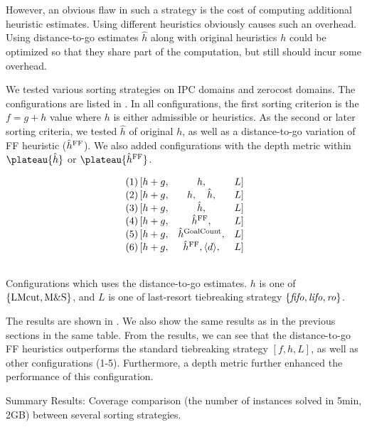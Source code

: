 However, an obvious flaw in such a strategy is the cost of computing additional
heuristic estimates. Using different heuristics obviously causes such an
overhead. Using distance-to-go estimates $\hat{h}$ along with
original heuristics $h$ could be optimized so that they share part of
the computation, but still should incur some overhead.

We tested various sorting strategies on IPC domains and zerocost domains.
The configurations are listed in . 
In all configurations, the first sorting criterion is the $f=g+h$ value
where $h$ is either admissible \lmcut or \mands heuristics.
As the second or later sorting criteria,
we tested $\hat{h}$ of original $h$, as well as a distance-to-go variation of FF
heuristic ($\hat{h}^{\text{FF}}$).
We also added configurations with the depth metric within
$\plateau{\hat{h}}$ or $\plateau{\hat{h}^{\text{\ff}}}$.

\begin{table}[htbp]
 \centering
 \[
 \begin{array}{lcll}
  (1)\, [h+g, & h,                           &L] \\\relax
  (2)\, [h+g, & h,     \quad   \hat{h},      &L] \\\relax
  (3)\, [h+g, & \hat{h},                     &L] \\\relax
  (4)\, [h+g, & \hat{h}^{\text{FF}},               &L] \\\relax
  (5)\, [h+g, & \hat{h}^{\text{GoalCount}},  &L] \\\relax
  (6)\, [h+g, & \hat{h}^{\text{FF}}, {\left<d\right>}, &L] \\\relax
 \end{array}  
 \]
 \caption{Configurations which uses the distance-to-go estimates. $h$ is
 one of ${\left\{\text{LMcut}, \text{M\&S}\right\}}$, and $L$ is one of last-resort
 tiebreaking strategy ${\left\{{\text{\textit{fifo}}},{\text{\textit{lifo}}},{\text{\textit{ro}}}\right\}}$. }
 \label{list:distance-configs}
\end{table}


The results are shown in . We also show the
same results as in the previous sections in the same table. From the
results, we can see that the distance-to-go FF heuristics 
outperforms the standard tiebreaking strategy $[f,h,L]$, as well as
other configurations (1-5). Furthermore, a depth metric further enhanced
the performance of this configuration.

\begin{table}[htbp]
 \centering
 \caption{
 Summary Results: Coverage comparison (the number
 of instances solved in 5min, 2GB) between several sorting strategies.
 }
 \label{tbl:distance-to-go}
\end{table}

